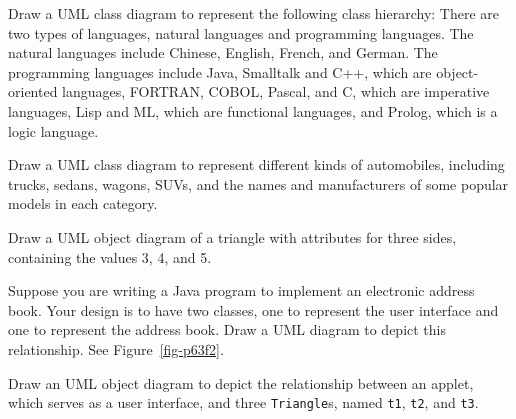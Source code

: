 \begin{EXRtwo}

\item Draw a UML class diagram to represent the following
class hierarchy: There are two types of languages, natural
languages and programming languages. The natural languages
include Chinese, English, French, and German. The programming
languages include Java, Smalltalk and C++, which are object-oriented
languages, FORTRAN, COBOL, Pascal, and C, which are imperative
languages, Lisp and ML, which are functional languages, and
Prolog, which is a logic language.

\item Draw a UML class diagram to represent different kinds of
automobiles, including trucks, sedans, wagons, SUVs, and the names
and manufacturers of some popular models in each category.

\item Draw a UML object diagram of a triangle with attributes for
three sides, containing the values 3, 4, and 5.

\item Suppose you are writing a Java program to implement an electronic
address book. Your design is to have two classes, one to represent the
user interface and one to represent the address book.  Draw a UML
diagram to depict this relationship. See Figure~\ref{fig-p63f2}.

\item Draw an UML object diagram to depict the relationship between
an applet, which serves as a user interface, and three {\tt Triangle}s,
named {\tt t1}, {\tt t2}, and {\tt t3}.


\end{EXRtwo}
%

